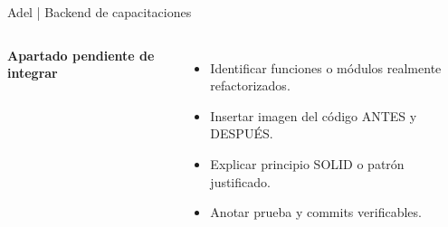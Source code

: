 \begin{frame}{Adel | Backend de capacitaciones}
\begin{columns}[T,onlytextwidth]
{\large\bfseries Apartado pendiente de integrar}\par\vspace{0.26cm}
\begin{itemize}\setlength\itemsep{0.22cm}
\item Identificar funciones o módulos realmente refactorizados.
\item Insertar imagen del código ANTES y DESPUÉS.
\item Explicar principio SOLID o patrón justificado.
\item Anotar prueba y commits verificables.
\end{itemize}
\end{columns}
\end{frame}
